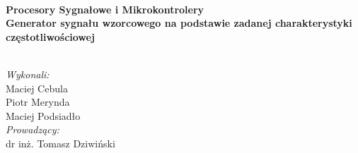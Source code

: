 \begin{titlepage}

\HRule \\[0.4cm]
{ \huge \bfseries Procesory Sygnałowe i Mikrokontrolery\\[1cm]Generator sygnału wzorcowego na podstawie zadanej charakterystyki częstotliwościowej}\\[0.4cm] %
\HRule \\[1.0cm]
 






\begin{flushleft}
\Large
\emph{Wykonali:}\\
Maciej Cebula\\
Piotr Merynda\\
Maciej Podsiadło\\[1cm]

 \emph{Prowadzący:}\\
dr inż. Tomasz Dziwiński\\[3cm] %
 
\end{flushleft}
\end{titlepage}
\clearpage
\setcounter{page}{2}